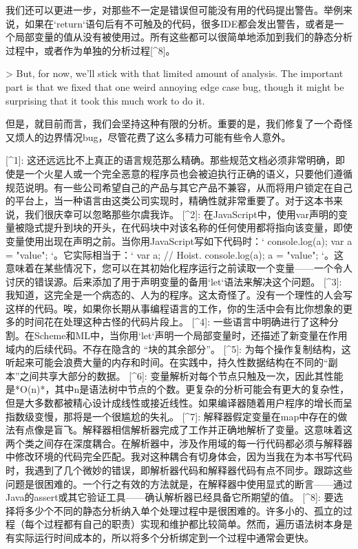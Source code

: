 \documentclass[cn,11pt,chinese]{elegantbook}
\begin{document}
{{{{{{{{{{{{{{{{{{我们还可以更进一步，对那些不一定是错误但可能没有用的代码提出警告。举例来说，如果在`return`语句后有不可触及的代码，很多IDE都会发出警告，或者是一个局部变量的值从没有被使用过。所有这些都可以很简单地添加到我们的静态分析过程中，或者作为单独的分析过程[^8]。

> But, for now, we’ll stick with that limited amount of analysis. The important part is that we fixed that one weird annoying edge case bug, though it might be surprising that it took this much work to do it.

但是，就目前而言，我们会坚持这种有限的分析。重要的是，我们修复了一个奇怪又烦人的边界情况bug，尽管花费了这么多精力可能有些令人意外。



[^1]: 这还远远比不上真正的语言规范那么精确。那些规范文档必须非常明确，即使是一个火星人或一个完全恶意的程序员也会被迫执行正确的语义，只要他们遵循规范说明。有一些公司希望自己的产品与其它产品不兼容，从而将用户锁定在自己的平台上，当一种语言由这类公司实现时，精确性就非常重要了。对于这本书来说，我们很庆幸可以忽略那些尔虞我诈。
[^2]: 在JavaScript中，使用var声明的变量被隐式提升到块的开头，在代码块中对该名称的任何使用都将指向该变量，即使变量使用出现在声明之前。当你用JavaScript写如下代码时：`{  console.log(a);  var a = "value"; }`。它实际相当于：`{  var a; // Hoist.  console.log(a);  a = "value"; }`。这意味着在某些情况下，您可以在其初始化程序运行之前读取一个变量——一个令人讨厌的错误源。后来添加了用于声明变量的备用`let`语法来解决这个问题。
[^3]: 我知道，这完全是一个病态的、人为的程序。这太奇怪了。没有一个理性的人会写这样的代码。唉，如果你长期从事编程语言的工作，你的生活中会有比你想象的更多的时间花在处理这种古怪的代码片段上。
[^4]: 一些语言中明确进行了这种分割。在Scheme和ML中，当你用`let`声明一个局部变量时，还描述了新变量在作用域内的后续代码。不存在隐含的 “块的其余部分”。
[^5]: 为每个操作复制结构，这听起来可能会浪费大量的内存和时间。在实践中，持久性数据结构在不同的“副本”之间共享大部分的数据。
[^6]: 变量解析对每个节点只触及一次，因此其性能是*O(n)*，其中n是语法树中节点的个数。更复杂的分析可能会有更大的复杂性，但是大多数都被精心设计成线性或接近线性。如果编译器随着用户程序的增长而呈指数级变慢，那将是一个很尴尬的失礼。
[^7]: 解释器假定变量在map中存在的做法有点像是盲飞。解释器相信解析器完成了工作并正确地解析了变量。这意味着这两个类之间存在深度耦合。在解析器中，涉及作用域的每一行代码都必须与解释器中修改环境的代码完全匹配。我对这种耦合有切身体会，因为当我在为本书写代码时，我遇到了几个微妙的错误，即解析器代码和解释器代码有点不同步。跟踪这些问题是很困难的。一个行之有效的方法就是，在解释器中使用显式的断言——通过Java的assert或其它验证工具——确认解析器已经具备它所期望的值。
[^8]: 要选择将多少个不同的静态分析纳入单个处理过程中是很困难的。许多小的、孤立的过程（每个过程都有自己的职责）实现和维护都比较简单。然而，遍历语法树本身是有实际运行时间成本的，所以将多个分析绑定到一个过程中通常会更快。



}}}}}}}}}}}}}}}}}}
\end{document}
